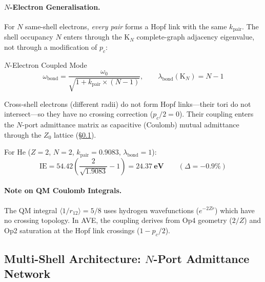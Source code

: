 \paragraph{$N$-Electron Generalisation.}
For $N$ same-shell electrons, \emph{every pair} forms a Hopf link with
the same $k_{\text{pair}}$. The shell occupancy $N$ enters through the
$\mathrm{K}_N$ complete-graph adjacency eigenvalue, not through
a modification of $p_c$:
\begin{resultbox}{$N$-Electron Coupled Mode}
\begin{equation}
    \omega_{\text{bond}} = \frac{\omega_0}{\sqrt{1 + k_{\text{pair}}
    \times (N-1)}}, \qquad \lambda_{\text{bond}}(\mathrm{K}_N) = N-1
    \label{eq:n_electron_mode}
\end{equation}
\end{resultbox}
Cross-shell electrons (different radii) do not form Hopf links---their
tori do not intersect---so they have no crossing correction ($p_c/2 = 0$).
Their coupling enters the $N$-port admittance matrix as capacitive
(Coulomb) mutual admittance through the $Z_0$ lattice
(\S\ref{sec:multi_shell}).

For He ($Z=2$, $N=2$, $k_{\text{pair}} = 0.9083$,
$\lambda_{\text{bond}} = 1$):
\begin{equation}
    \text{IE} = 54.42\left(\frac{2}{\sqrt{1.9083}} - 1\right)
    = \mathbf{24.37~\text{eV}} \qquad (\Delta = -0.9\%)
    \label{eq:he_ie_result}
\end{equation}

\paragraph{Note on QM Coulomb Integrals.}
The QM integral $\langle 1/r_{12}\rangle = 5/8$ uses hydrogen
wavefunctions ($e^{-2Zr}$) which have no crossing topology.
In AVE, the coupling derives from Op4 geometry ($2/Z$) and
Op2 saturation at the Hopf link crossings ($1 - p_c/2$).

\subsection{Multi-Shell Architecture: $N$-Port Admittance Network}
\label{sec:multi_shell}

